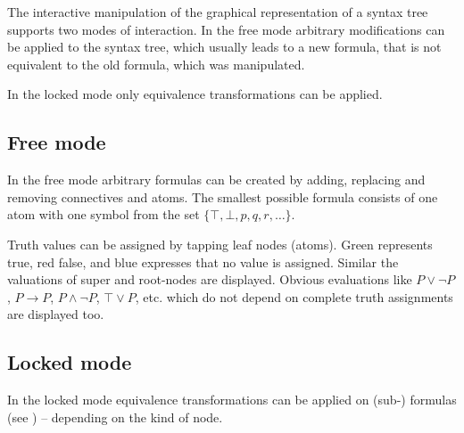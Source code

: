 The interactive manipulation of the graphical representation of a syntax tree supports two modes of interaction.
In the free mode arbitrary modifications can be applied to the syntax tree, which usually leads to a new formula,
that is not equivalent to the old formula, which was manipulated.
 
In the locked mode only equivalence transformations can be applied.

\subsection{Free mode }

In the free mode arbitrary formulas can be created by adding, replacing and removing connectives and atoms. 
The smallest possible formula consists of one atom with one symbol from the set $\{ \top, \bot, p, q, r, … \}$.

Truth values can be assigned by tapping leaf nodes (atoms). 
Green represents true, red false, and blue expresses that no value is assigned.
Similar the valuations of super and root-nodes are displayed.
Obvious evaluations like
$P \vee \neg P$, 
$P \rightarrow P$,
$P \wedge \neg P$,
$\top \vee P$, etc.
which do not depend on complete truth assignments are displayed too.

\subsection{Locked mode}

In the locked mode equivalence transformations can be applied on (sub-) formulas (see )
– depending on the kind of node. 


